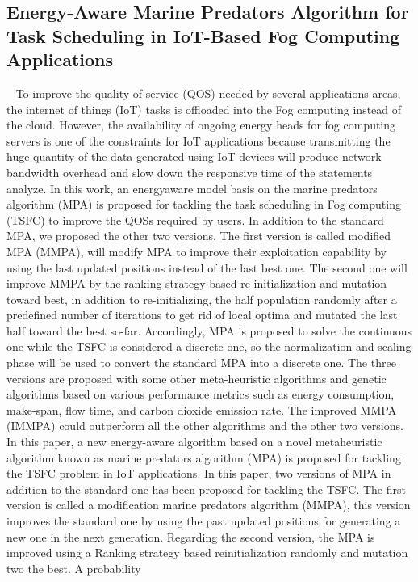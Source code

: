 \subsection{Energy-Aware Marine Predators Algorithm for Task Scheduling in IoT-Based Fog Computing Applications}~\cite{abdel2020energy}
To improve the quality of service (QOS) needed by
several applications areas, the internet of things (IoT) tasks is
offloaded into the Fog computing instead of the cloud. However,
the availability of ongoing energy heads for fog computing servers
is one of the constraints for IoT applications because transmitting
the huge quantity of the data generated using IoT devices will
produce network bandwidth overhead and slow down the
responsive time of the statements analyze. In this work, an energyaware model basis on the marine predators algorithm (MPA) is
proposed for tackling the task scheduling in Fog computing
(TSFC) to improve the QOSs required by users. In addition to the
standard MPA, we proposed the other two versions. The first
version is called modified MPA (MMPA), will modify MPA to
improve their exploitation capability by using the last updated
positions instead of the last best one. The second one will improve
MMPA by the ranking strategy-based re-initialization and
mutation toward best, in addition to re-initializing, the half
population randomly after a predefined number of iterations to
get rid of local optima and mutated the last half toward the best
so-far. Accordingly, MPA is proposed to solve the continuous one
while the TSFC is considered a discrete one, so the normalization
and scaling phase will be used to convert the standard MPA into a
discrete one. The three versions are proposed with some other
meta-heuristic algorithms and genetic algorithms based on various
performance metrics such as energy consumption, make-span,
flow time, and carbon dioxide emission rate. The improved
MMPA (IMMPA) could outperform all the other algorithms and
the other two versions. \\
In this paper, a new energy-aware algorithm based on a novel metaheuristic algorithm known as marine predators algorithm (MPA) is
proposed for tackling the TSFC problem in IoT applications. In this
paper, two versions of MPA in addition to the standard one has
been proposed for tackling the TSFC. The first version is called a
modification marine predators algorithm (MMPA), this version
improves the standard one by using the past updated positions for
generating a new one in the next generation. Regarding the second
version, the MPA is improved using a Ranking strategy based reinitialization randomly and mutation two the best. A probability
